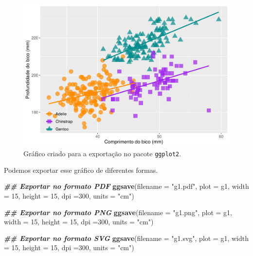 \documentclass[
]{article}
\newenvironment{Shaded}{\begin{snugshade}}{\end{snugshade}}
\newcommand{\AttributeTok}[1]{\textcolor[rgb]{0.13,0.29,0.53}{#1}}
\newcommand{\DecValTok}[1]{\textcolor[rgb]{0.00,0.00,0.81}{#1}}
\newcommand{\DocumentationTok}[1]{\textcolor[rgb]{0.56,0.35,0.01}{\textbf{\textit{#1}}}}
\newcommand{\FunctionTok}[1]{\textcolor[rgb]{0.13,0.29,0.53}{\textbf{#1}}}
\newcommand{\NormalTok}[1]{#1}
\newcommand{\StringTok}[1]{\textcolor[rgb]{0.31,0.60,0.02}{#1}}
\begin{document}
\begin{figure}
\centering
\includegraphics{epr_files/figure-latex/fig-plot-final-export-1.pdf}
\caption{\label{fig:fig-plot-final-export}Gráfico criado para a exportação no pacote \texttt{ggplot2}.}
\end{figure}

Podemos exportar esse gráfico de diferentes formas.

\begin{Shaded}
\begin{Highlighting}[]
\DocumentationTok{\#\# Exportar no formato PDF}
\FunctionTok{ggsave}\NormalTok{(}\AttributeTok{filename =} \StringTok{"g1.pdf"}\NormalTok{, }
       \AttributeTok{plot =}\NormalTok{ g1, }
       \AttributeTok{width =} \DecValTok{15}\NormalTok{, }
       \AttributeTok{height =} \DecValTok{15}\NormalTok{, }
       \AttributeTok{dpi =}\DecValTok{300}\NormalTok{,}
       \AttributeTok{units =} \StringTok{"cm"}\NormalTok{)}

\DocumentationTok{\#\# Exportar no formato PNG}
\FunctionTok{ggsave}\NormalTok{(}\AttributeTok{filename =} \StringTok{"g1.png"}\NormalTok{, }
       \AttributeTok{plot =}\NormalTok{ g1, }
       \AttributeTok{width =} \DecValTok{15}\NormalTok{, }
       \AttributeTok{height =} \DecValTok{15}\NormalTok{, }
       \AttributeTok{dpi =}\DecValTok{300}\NormalTok{,}
       \AttributeTok{units =} \StringTok{"cm"}\NormalTok{)}

\DocumentationTok{\#\# Exportar no formato SVG}
\FunctionTok{ggsave}\NormalTok{(}\AttributeTok{filename =} \StringTok{"g1.svg"}\NormalTok{, }
       \AttributeTok{plot =}\NormalTok{ g1, }
       \AttributeTok{width =} \DecValTok{15}\NormalTok{, }
       \AttributeTok{height =} \DecValTok{15}\NormalTok{, }
       \AttributeTok{dpi =}\DecValTok{300}\NormalTok{,}
       \AttributeTok{units =} \StringTok{"cm"}\NormalTok{)}
\end{Highlighting}
\end{Shaded}
\end{document}
